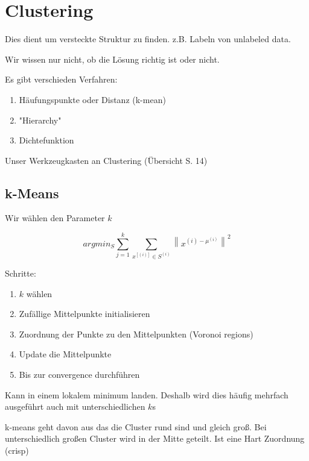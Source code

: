 \documentclass[a4paper]{article}
\title{\docTitle}
\author{Moritz}
\date{\today}
\begin{document}
\maketitle
\tableofcontents


\section{Clustering}

Dies dient um versteckte Struktur zu finden. z.B. Labeln von unlabeled data.

Wir wissen nur nicht, ob die Lösung richtig ist oder nicht.

Es gibt verschieden Verfahren:

\begin{enumerate}
    \item Häufungspunkte oder Distanz (k-mean)
    \item "Hierarchy"
    \item Dichtefunktion
\end{enumerate}

Unser Werkzeugkasten an Clustering (Übersicht S. 14)

\subsection{k-Means}

Wir wählen den Parameter $k$

\[
argmin_S \sum_{j=1}^{k}\sum_{x^[(i)]\in S^{(i)}} \left\|x^{(i)-\mu^{(i)}}\right\|^2
\]

Schritte:

\begin{enumerate}
    \item $k$ wählen
    \item Zufällige Mittelpunkte initialisieren
    \item Zuordnung der Punkte zu den Mittelpunkten (Voronoi regions)
    \item Update die Mittelpunkte
    \item Bis zur convergence durchführen
\end{enumerate}

Kann in einem lokalem minimum landen. Deshalb wird dies häufig mehrfach ausgeführt auch mit unterschiedlichen $k$s

k-means geht davon aus das die Cluster rund sind und gleich groß. Bei unterschiedlich großen Cluster wird in der Mitte geteilt. Ist eine Hart Zuordnung (crisp)
\end{document}
